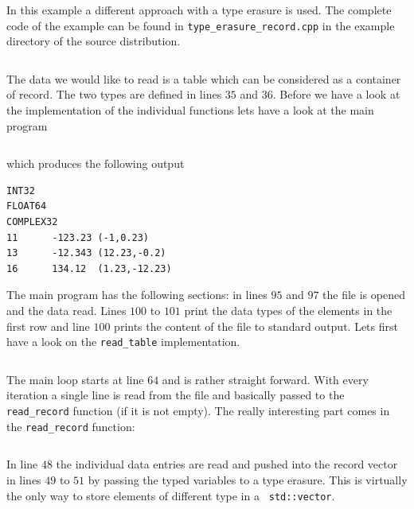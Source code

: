 In this example a different approach with a type erasure is used. 
The complete code of the example can be found in {\tt type\_erasure\_record.cpp}
in the example directory of the source distribution.
\inputminted[linenos,
             fontsize=\small,
             firstnumber=26,
             firstline=26,
             lastline=36,
             frame=lines,
             label=examples/type\_erasure\_record.cpp
             ]
{cpp}{../examples/type_erasure_record.cpp}
The data we would like to read is a table which can be considered as a container
of record. The two types are defined in lines $35$ and $36$. Before we have a
look at the implementation of the individual functions lets have a look at the
main program
\inputminted[linenos,
             fontsize=\small,
             firstnumber=93,
             firstline=93,
             lastline=106,
             frame=lines,
             label=examples/type\_erasure\_record.cpp
             ]
{cpp}{../examples/type_erasure_record.cpp}
which produces the following output
\begin{verbatim}
INT32
FLOAT64
COMPLEX32
11      -123.23 (-1,0.23)
13      -12.343 (12.23,-0.2)
16      134.12  (1.23,-12.23)
\end{verbatim}
The main program has the following sections: in lines $95$ and $97$ the file
is opened and the data read. Lines $100$ to $101$ print the data types of the
elements in the first row and line $100$ prints the content of the file to
standard output.
Lets first have a look on the {\tt read\_table} implementation.
\inputminted[linenos,
             fontsize=\small,
             firstnumber=56,
             firstline=56,
             lastline=72,
             frame=lines,
             label=examples/type\_erasure\_record.cpp
             ]
{cpp}{../examples/type_erasure_record.cpp}
The main loop starts at line $64$ and is rather straight forward. With every
iteration a single line is read from the file and basically passed to the {\tt
read\_record} function (if it is not empty). 
The really interesting part comes in the {\tt read\_record} function:
\inputminted[linenos,
             fontsize=\small,
             firstnumber=38,
             firstline=38,
             lastline=54,
             frame=lines,
             label=examples/type\_erasure\_record.cpp
             ]
{cpp}{../examples/type_erasure_record.cpp}
In line $48$ the individual data entries are read and pushed into the record
vector in lines $49$ to $51$ by passing the typed variables to a type erasure. 
This is virtually the only way to store elements of different type in a {\tt
std::vector}.
\inputminted[linenos,
             fontsize=\small,
             firstnumber=74,
             firstline=74,
             lastline=81,
             frame=lines,
             label=examples/type\_erasure\_record.cpp
             ]
{cpp}{../examples/type_erasure_record.cpp}

\inputminted[linenos,
             fontsize=\small,
             firstnumber=83,
             firstline=83,
             lastline=89,
             frame=lines,
             label=examples/type\_erasure\_record.cpp
             ]
{cpp}{../examples/type_erasure_record.cpp}

